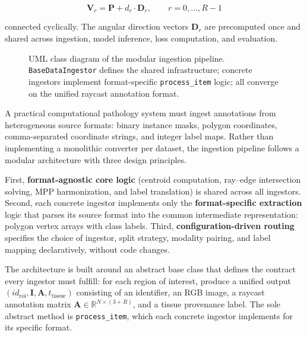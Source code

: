\begin{equation}
    \mathbf{V}_r = \mathbf{P} + d_r \cdot \mathbf{D}_r, \qquad r = 0, \ldots, R-1
\end{equation}

connected cyclically. The angular direction vectors $\mathbf{D}_r$ are precomputed once and shared across ingestion, model inference, loss computation, and evaluation.

\label{sec:ingestion}

\begin{figure}[H]
	\centering
	\resizebox{0.9\textwidth}{!}{}
    \caption[UML class diagram of the modular ingestion pipeline.]{UML class diagram of the modular ingestion pipeline. \texttt{BaseDataIngestor} defines the shared infrastructure; concrete ingestors implement format-specific \texttt{process\_item} logic; all converge on the unified raycast annotation format.}
	\label{fig:ingestor-uml}
\end{figure}

A practical computational pathology system must ingest annotations from heterogeneous source formats: binary instance masks, polygon coordinates, comma-separated coordinate strings, and integer label maps. Rather than implementing a monolithic converter per dataset, the ingestion pipeline follows a modular architecture with three design principles.

First, \textbf{format-agnostic core logic} (centroid computation, ray--edge intersection solving, MPP harmonization, and label translation) is shared across all ingestors. Second, each concrete ingestor implements only the \textbf{format-specific extraction} logic that parses its source format into the common intermediate representation: polygon vertex arrays with class labels. Third, \textbf{configuration-driven routing} specifies the choice of ingestor, split strategy, modality pairing, and label mapping declaratively, without code changes.

The architecture is built around an abstract base class that defines the contract every ingestor must fulfill: for each region of interest, produce a unified output $(id_{\text{roi}}, \mathbf{I}, \mathbf{A}, t_{\text{tissue}})$ consisting of an identifier, an RGB image, a raycast annotation matrix $\mathbf{A} \in \mathbb{R}^{N \times (3+R)}$, and a tissue provenance label. The sole abstract method is \texttt{process\_item}, which each concrete ingestor implements for its specific format.


